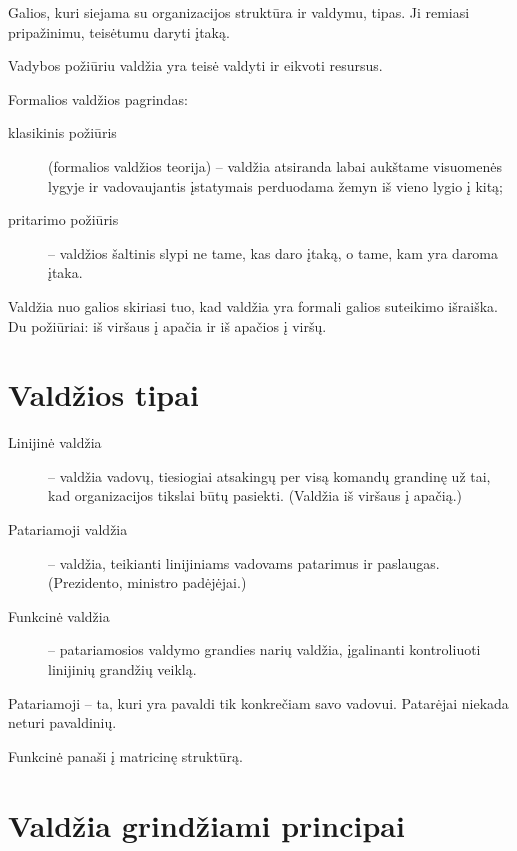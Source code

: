 \begin{defn}
  Galios, kuri siejama su organizacijos struktūra ir valdymu, tipas.
  Ji remiasi pripažinimu, teisėtumu daryti įtaką.
\end{defn}

Vadybos požiūriu valdžia yra teisė valdyti ir eikvoti resursus.

Formalios valdžios pagrindas:
\begin{description}
  \item[klasikinis požiūris] (formalios valdžios teorija) – valdžia
    atsiranda labai aukštame visuomenės lygyje ir vadovaujantis
    įstatymais perduodama žemyn iš vieno lygio į kitą;
  \item[pritarimo požiūris] – valdžios šaltinis slypi ne tame, kas
    daro įtaką, o tame, kam yra daroma įtaka.
\end{description}

Valdžia nuo galios skiriasi tuo, kad valdžia yra formali galios suteikimo
išraiška. Du požiūriai: iš viršaus į apačia ir iš apačios į viršų.

\section{Valdžios tipai}

\begin{description}
  \item[Linijinė valdžia] – valdžia vadovų, tiesiogiai atsakingų per
    visą komandų grandinę už tai, kad organizacijos tikslai būtų pasiekti.
    (Valdžia iš viršaus į apačią.)
  \item[Patariamoji valdžia] – valdžia, teikianti linijiniams vadovams
    patarimus ir paslaugas. (Prezidento, ministro padėjėjai.)
  \item[Funkcinė valdžia] – patariamosios valdymo grandies narių valdžia,
    įgalinanti kontroliuoti linijinių grandžių veiklą.
\end{description}

Patariamoji – ta, kuri yra pavaldi tik konkrečiam savo vadovui. Patarėjai
niekada neturi pavaldinių.

Funkcinė panaši į matricinę struktūrą.

\section{Valdžia grindžiami principai}

